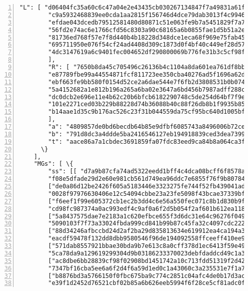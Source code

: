 \begin{appendices}
\begin{Verbatim}[commandchars=\\\{\}, numbers=left]
        "L": [ "d06404fc35a60c6c47a04e2e43435cb030267134847f7a49831a61f82307fc32",
        "c9a5932468839ee0cda1aa2815f156746d4dce79dab3013f4c9946fce6b69eff",
        "efdae043dcedb79512581480d80871c51e063fe9b7a5451829f7a7824bcc5a0b",
        "56fd2e74ac6e1766cfd56c8303a90c68165a6b0855fae1d5b51a2e035f333a1d",
        "81736ed768f57e7f8d440b4b18228d348dce1eca68f969e75fab458f44174c99",
        "695711950e076f54cf24ad4408d309c1873d0f4bf40c449ef28d577ba74dd86d",
        "4dc3147619a6c9401fec004652df290800069b776fe31b3c5cf98f64eb13ef2c"
        ], 
        "R": [ "7650b8da45c705496c26136b4c1104a8da601ea761df8bba07f1249495d8f1ce",
        "e87789fbe99a44554871fcf811723ee350cba40276ad5f1696a62d91a4363fa6",
        "ebf663fe9bb580f0154d52ce2a6dae544e7f6fb2d3808531b0b0749f5152ddbf",
        "5a4152682a1e812b196a265a6ba02e3647a6bd456b7987adff288c5b0b556ec6",
        "dc0dcb2e696e11e4b62c20b6bfcb6182290748c5de254d64bf7f9e3c38fb46c9",
        "101e2271ced03b229b88228d74b36088b40c88f26db8b1f9935b85fb3ab96043",
        "b14aae1d35c9b176ac526c23f31b044559da75cf95bc640d1005bfcc6367040b"
        ], 
        "a": "4809857de0bd6becdb64b85e9dfbf6085743a8496006b72ceb81e01080965003", 
        "b": "791d8dc3a4ddde5ba2416546127eb194918839ced3dea7399f9c36a17f36150e", 
        "t": "aace86a7a1cbdec3691859fa07fdc83eed9ca84b8a064ca3f0149e7d6b721c03"
      \}
    ], 
    "MGs": [ \{
        "ss": [[ "d7a9b87cfa74ad5322eedd1bff4c4dca08bcff6f8578a29a8bc4ad6789dee106",
        "f08e5dfade29d2e60e981cb561d749ea96ddc7e6855f76f9b807842d1a17fe00"],
        ["de0a86d12be2426f605a5183446e3323275fe744f52fb439041ad2d59136ea0b",
        "0028f97976630406e12c54094cbbe23a23fe5098f43bcae37339bfc0c4c74c07"],
        ["f6eef1f99e605372cb1ec2b3dd4c6e56a550fec071c8b1d830b9fda34de5cc05",
        "cd98fc987374a0ac993edf4c9af0a6f2d5b054f2af601b612ea118f405303306"],
        ["5a8437575dae7e2183a1c620efbce655f3d6dc31e64c96276f04976243461e08",
        "5090103f7f73a33024fbda999cd841b99b87c45fa32c4097cdc222fa3d7e9502"],
        ["88d34246afbccbd24d2af2ba29d835813634e619912ea4ca194a32281ac14e0e",
        "eacdf59478f132dd8dbb9580546f96de194092558ffceeff410ee9eb30ce570e"],
        ["571dab8557921bbae30bda9b7e613c8a0cff378d1ec6413f59e4972f30f2470d",
        "5ca78da9a129619299304d9b03186233370023debfdaddcd49c1a338c1f0c50d"],
        ["ac8dbe6bb28839cf98f02908bd1451742a10c713fdd51319f2d42a58bf1d7507",
        "7347bf16cba5ee6a6f2d4f6a59d1ed0c1a43060c3a235531e7f1a75cd8c8530d"],
        ["b8876bd3a5766150f0fbc675ba9c774c2851c04afc4de0b17d3ac4b6de617402",
        "e39f1d2452d76521cbf02b85a6b626eeb5994f6f28ce5cf81adc0ff2b8adb907"],

\end{Verbatim}
\end{appendices}
